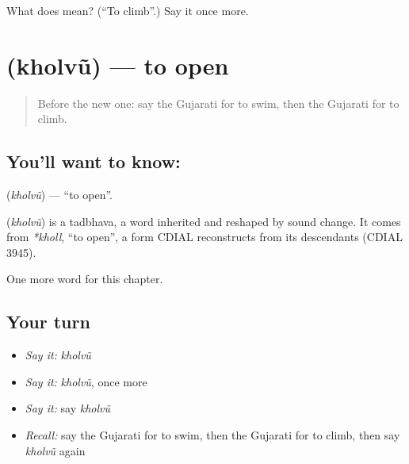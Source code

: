 \begin{tcolorbox}[breakable,colback=teal!4,colframe=teal!35!black,title={Before you move on}]
What does  mean? (\textquotedblleft{}To climb\textquotedblright{}.) Say it once more.
\end{tcolorbox}
\section[\texorpdfstring{\gu{ખોલવું} (kholvũ)}{ખોલવું (kholvũ)}]{ (kholvũ) — to open}

\label{lesson:GU-C138-kholvu}



\begin{quote}
Before the new one: say the Gujarati for to swim, then the Gujarati for to climb.
\end{quote}

\subsection*{You'll want to know: }
\textbf{} (\emph{kholvũ}) — \textquotedblleft{}to open\textquotedblright{}.

\begin{cousinweb}
\textbf{} (\emph{kholvũ}) is a tadbhava, a word inherited and reshaped by sound change. It comes from \emph{*kholl}, \textquotedblleft{}to open\textquotedblright{}, a form CDIAL reconstructs from its descendants (CDIAL 3945).
\end{cousinweb}

\begin{grammarlens}[title={What you've built}]
One more word for this chapter.
\end{grammarlens}

\subsection*{Your turn}
\begin{itemize}
\raggedright
  \item \emph{Say it:} \emph{kholvũ}
  \item \emph{Say it:} \emph{kholvũ}, once more
  \item \emph{Say it:} say \emph{kholvũ}
  \item \emph{Recall:} say the Gujarati for to swim, then the Gujarati for to climb, then say \emph{kholvũ} again
\end{itemize}

